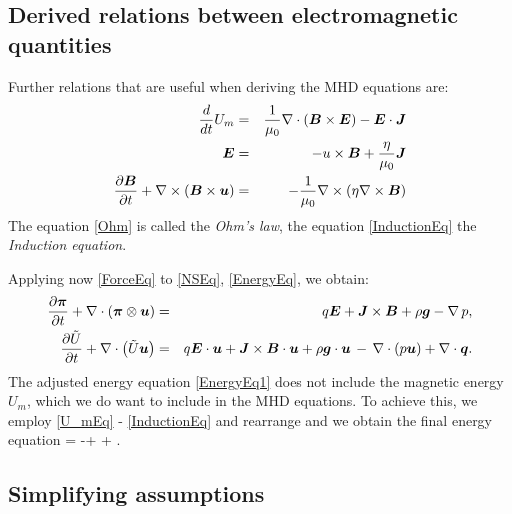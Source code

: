 \subsection{Derived relations between electromagnetic quantities}
Further relations that are useful when deriving the MHD equations are:
\begin{eqnarray}
\label{U_mEq} \frac{d}{dt} U_m & = & \frac{1}{\mu_0}\nabla \cdot \left( \mbox{\boldmath $B$}\times\mbox{\boldmath $E$}\right) - \mbox{\boldmath $E$}\cdot\mbox{\boldmath $J$}\\
\label{Ohm} \mbox{\boldmath $E$} & = & -u \times \mbox{\boldmath $B$} + \frac{\eta}{\mu_0}\mbox{\boldmath $J$}\\
\label{InductionEq} \frac{\partial{\mbox{\boldmath $B$}}}{\partial{t}} + \nabla \times \left( \mbox{\boldmath $B$} \times \mbox{\boldmath $u$} \right) & = & -\frac{1}{\mu_0} \nabla \times \left( \eta \nabla \times \mbox{\boldmath $B$} \right)
\end{eqnarray}
The equation \ref{Ohm} is called the \textit{Ohm's law}, the equation \ref{InductionEq} the \textit{Induction equation}.

Applying now \ref{ForceEq} to \ref{NSEq}, \ref{EnergyEq}, we obtain:
\begin{eqnarray}
\label{NSEq1} \frac{\partial{\mbox{\boldmath $\pi$}}}{\partial{t}} + \nabla\cdot\left(\mbox{\boldmath $\pi$}\otimes\mbox{\boldmath $u$}\right)& = & q\mbox{\boldmath $E$} + \mbox{\boldmath $J$}\times\mbox{\boldmath $B$} + \rho\mbox{\boldmath $g$} - \nabla\,p,\\
\label{EnergyEq1} \frac{\partial{\tilde{U}}}{\partial{t}} + \nabla\cdot\left({\tilde{U}}\mbox{\boldmath $u$}\right) & = & q\mbox{\boldmath $E$}\cdot\mbox{\boldmath $u$} + \mbox{\boldmath $J$}\times\mbox{\boldmath $B$}\cdot\mbox{\boldmath $u$} + \rho\mbox{\boldmath $g$}\cdot\mbox{\boldmath $u$} \,-\,\nabla\cdot\left({p}\mbox{\boldmath $u$}\right) + \nabla\cdot\mbox{\boldmath $q$}.
\end{eqnarray}
The adjusted energy equation \ref{EnergyEq1} does not include the magnetic energy $U_m$, which we do want to include in the MHD equations. To achieve this, we employ \ref{U_mEq} - \ref{InductionEq} and rearrange and we obtain the final energy equation
\be
\label{EnergyEqPrefinal}  = -\nabla\cdot{} + \rho \bfg \cdot \bfu + \nabla\cdot\bfq.
\ee

\subsection{Simplifying assumptions}
